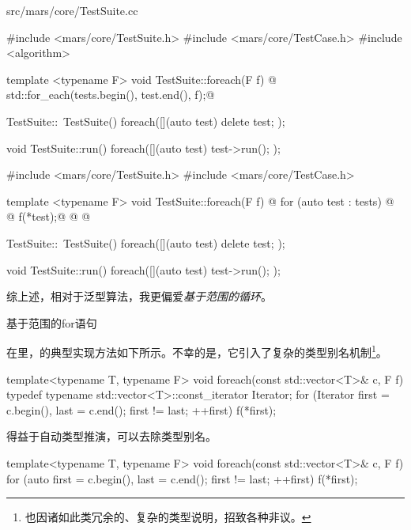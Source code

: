 \begin{content}
\begin{diff}{src/mars/core/TestSuite.cc}
 \begin{minicpp}
#include <mars/core/TestSuite.h>
#include <mars/core/TestCase.h>
#include <algorithm>

template <typename F>
void TestSuite::foreach(F f) {
@  std::for_each(tests.begin(), test.end(), f);@
}

TestSuite::~TestSuite() {
  foreach([](auto test){
    delete test;
  });
}

void TestSuite::run() {
  foreach([](auto test){
    test->run();
  });
}
 \end{minicpp}
\tcblower
 \begin{minicpp}
#include <mars/core/TestSuite.h>
#include <mars/core/TestCase.h>

template <typename F>
void TestSuite::foreach(F f) {
@  for (auto test : tests) {@
@    f(*test);@
@  }@
}

TestSuite::~TestSuite() {
  foreach([](auto test) {
    delete test;
  });
}

void TestSuite::run() {
  foreach([](auto test){
    test->run();
  });
}
 \end{minicpp}
\end{diff}

综上述，相对于泛型算法，我更偏爱\emph{基于范围的循环}。

\begin{episode}{基于范围的for语句}
\begin{content}

在里，的典型实现方法如下所示。不幸的是，它引入了复杂的类型别名机制\footnote{\cpp{}也因诸如此类冗余的、复杂的类型说明，招致各种非议。}。

 \begin{c++}[title={\ttfamily{实现foreach：应用for循环，C++98}}]
template<typename T, typename F>
void foreach(const std::vector<T>& c, F f) {
  typedef typename std::vector<T>::const_iterator Iterator;
  for (Iterator first = c.begin(), last = c.end(); first != last; ++first) {
    f(*first);
  }
}
 \end{c++}

得益于自动类型推演，可以去除类型别名。

 \begin{c++}[title={\ttfamily{实现foreach：应用for循环，auto类型推演，C++11}}]
template<typename T, typename F>
void foreach(const std::vector<T>& c, F f) {
  for (auto first = c.begin(), last = c.end(); first != last; ++first) {
    f(*first);
  }
}
 \end{c++}


\end{content}
\end{episode}
\end{content}
